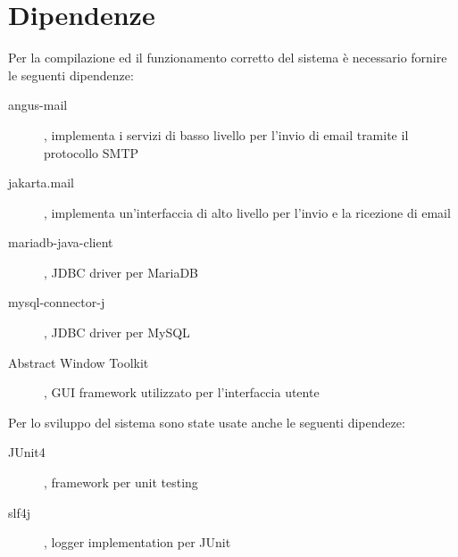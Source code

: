 
\section{Dipendenze}
\label{sec:dependency}
Per la compilazione ed il funzionamento corretto del sistema è
necessario fornire le seguenti dipendenze:
\begin{description}
\item[angus-mail], implementa i servizi di basso livello per l'invio di email tramite il protocollo SMTP
\item[jakarta.mail], implementa un'interfaccia di alto livello per l'invio e la ricezione di email
\item[mariadb-java-client], JDBC driver per MariaDB
\item[mysql-connector-j], JDBC driver per MySQL
\item[Abstract Window Toolkit], GUI framework utilizzato per l'interfaccia utente
\end{description}

Per lo sviluppo del sistema sono state usate anche le seguenti
dipendeze:
\begin{description}
\item[JUnit4], framework per unit testing
\item[slf4j], logger implementation per JUnit
\end{description}
